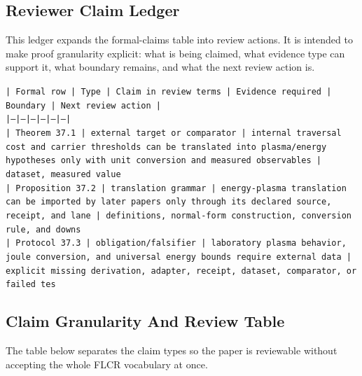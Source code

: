 \documentclass[11pt]{article}
\begin{document}
\subsection*{Reviewer Claim Ledger}

This ledger expands the formal-claims table into review actions. It is intended to make proof granularity explicit: what is being claimed, what evidence type can support it, what boundary remains, and what the next review action is.

\noindent\texttt{| Formal row | Type | Claim in review terms | Evidence required | Boundary | Next review action |}\\
\noindent\texttt{|---|---|---|---|---|---|}\\
\noindent\texttt{| Theorem 37.1 | external target or comparator | internal traversal cost and carrier thresholds can be translated into plasma/energy hypotheses only with unit conversion and measured observables | dataset, measured value}\\
\noindent\texttt{| Proposition 37.2 | translation grammar | energy-plasma translation can be imported by later papers only through its declared source, receipt, and lane | definitions, normal-form construction, conversion rule, and downs}\\
\noindent\texttt{| Protocol 37.3 | obligation/falsifier | laboratory plasma behavior, joule conversion, and universal energy bounds require external data | explicit missing derivation, adapter, receipt, dataset, comparator, or failed tes}\\

\subsection*{Claim Granularity And Review Table}

The table below separates the claim types so the paper is reviewable without accepting the whole FLCR vocabulary at once.
\end{document}
